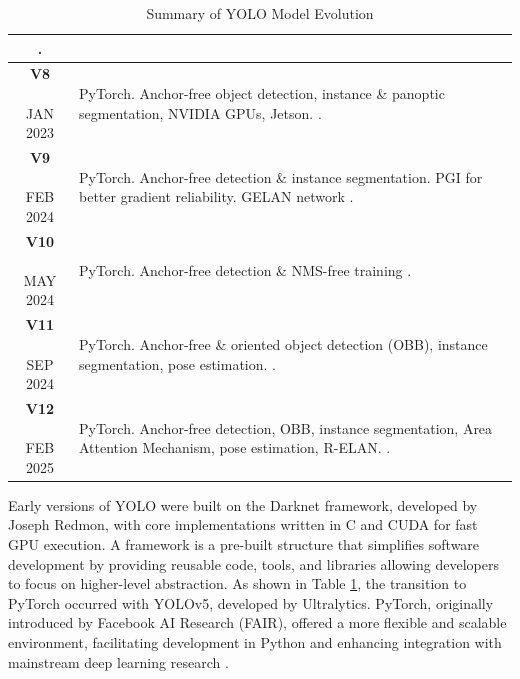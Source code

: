 \documentclass[a4paper,10pt,twocolumn]{article}
\numberwithin{figure}{section}
\numberwithin{table}{section}
\begin{document}
\begin{table}[htbp]
{\begin{tabularx}{\linewidth}{|c|X|}
{        \citep{wang2022yolov7}.} \\
        \hline
        \makecell[t]{\textbf{V8} \\ \\ {\tiny JAN 2023}} 
        & {\footnotesize PyTorch. Anchor-free object detection, instance \& panoptic segmentation,
        NVIDIA GPUs, Jetson.
        \citep{ultralytics2025yolov8}.} \\
        \hline
        \makecell[t]{\textbf{V9} \\ \\ {\tiny FEB 2024}} 
        & {\footnotesize PyTorch. Anchor-free detection \& instance segmentation.
        PGI for better gradient reliability.
        GELAN network \citep{wang2024yolov9}.} \\
        \hline
        \makecell[t]{\textbf{V10} \\ \\ {\tiny MAY 2024}} 
        & {\footnotesize PyTorch. Anchor-free detection \& NMS-free training
        \citep{wang2024yolov10}.} \\
        \hline
        \makecell[t]{\textbf{V11} \\ \\ {\tiny SEP 2024}} 
        & {\footnotesize PyTorch. Anchor-free \& oriented object detection (OBB), instance segmentation, pose estimation.
        \citep{UltralyticsYOLO11}.} \\
        \hline
        \makecell[t]{\textbf{V12} \\ \\ {\tiny FEB 2025}} 
        & {\footnotesize PyTorch. Anchor-free detection, OBB, instance segmentation, Area Attention Mechanism, pose estimation, R-ELAN.
        \citep{UltralyticsYOLO11}.} \\
        \hline
    \end{tabularx}
    }
    \caption{Summary of YOLO Model Evolution}
    \label{tab:yolo_versions}
\end{table}


Early versions of YOLO were built on the Darknet framework, 
developed by Joseph Redmon, with core implementations written in 
C and CUDA for fast GPU execution. A framework is a pre-built structure that simplifies software 
development by providing reusable code, tools, and libraries
allowing developers to focus on higher-level abstraction.
As shown in Table 
\ref{tab:yolo_versions}, the transition to PyTorch occurred 
with YOLOv5, developed by Ultralytics. 
PyTorch, originally introduced by Facebook AI Research (FAIR), 
offered a more flexible and scalable environment, 
facilitating development in Python and enhancing integration
 with mainstream deep learning research \citep{ultralytics2024yolov5}.
\end{document}

